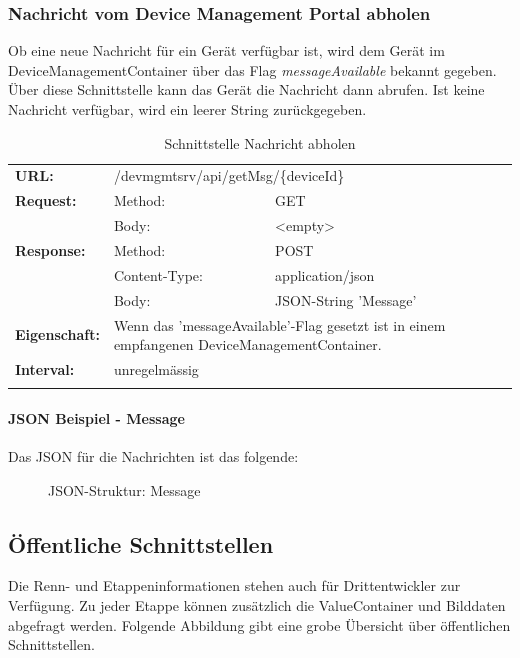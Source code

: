 \subsubsection{Nachricht vom Device Management Portal abholen}

Ob eine neue Nachricht für ein Gerät verfügbar ist, wird dem Gerät im DeviceManagementContainer über das Flag \textit{messageAvailable} bekannt gegeben. Über diese Schnittstelle kann das Gerät die Nachricht dann abrufen. Ist keine Nachricht verfügbar, wird ein leerer String zurückgegeben.

{\renewcommand{\arraystretch}{1}
    \begin{longtable}{ p{2.5cm} p{3.5cm} p{6cm}}

	\textbf{URL:} & \multicolumn{2}{p{10cm}}{/devmgmtsrv/api/getMsg/\{deviceId\}} \\
	\textbf{Request:} & Method: & GET \\
		& Body: & <empty> \\
	\textbf{Response:} & Method: & POST \\
		& Content-Type: & application/json \\
		& Body: & JSON-String 'Message' \\
	\textbf{Eigenschaft:} & \multicolumn{2}{p{10cm}}{ Wenn das 'messageAvailable'-Flag gesetzt ist in einem empfangenen DeviceManagementContainer.} \\
	\textbf{Interval:} & \multicolumn{2}{p{10cm}}{unregelmässig}\\
	
\caption{Schnittstelle Nachricht abholen}
\end{longtable} }

\paragraph{JSON Beispiel - Message}
Das JSON für die Nachrichten ist das folgende:
\begin{figure}[H]
	\centering
	
	\caption{JSON-Struktur: Message}
\end{figure}

\subsection{Öffentliche Schnittstellen}
\label{sec:tourlivepublicapi}

Die Renn- und Etappeninformationen stehen auch für Drittentwickler zur Verfügung. Zu jeder Etappe können zusätzlich die ValueContainer und Bilddaten abgefragt werden. Folgende Abbildung gibt eine grobe Übersicht über öffentlichen Schnittstellen.

